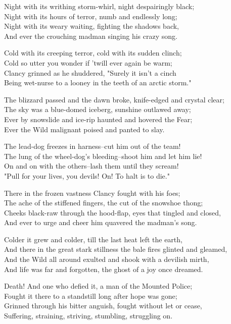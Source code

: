 \begin{poemblock}
 Night with its writhing storm-whirl, night despairingly black;\\
\idt Night with its hours of terror, numb and endlessly long;\\
 Night with its weary waiting, fighting the shadows back,\\
\idt And ever the crouching madman singing his crazy song.

 Cold with its creeping terror, cold with its sudden clinch;\\
\idt Cold so utter you wonder if 'twill ever again be warm;\\
 Clancy grinned as he shuddered, "Surely it isn't a cinch\\
\idt Being wet-nurse to a looney in the teeth of an arctic storm."

 The blizzard passed and the dawn broke, knife-edged and crystal clear;\\
\idt The sky was a blue-domed iceberg, sunshine outlawed away;\\
 Ever by snowslide and ice-rip haunted and hovered the Fear;\\
\idt Ever the Wild malignant poised and panted to slay.

 The lead-dog freezes in harness--cut him out of the team!\\
\idt The lung of the wheel-dog's bleeding--shoot him and let him lie!\\
 On and on with the others--lash them until they scream!\\
\idt "Pull for your lives, you devils! On! To halt is to die."

 There in the frozen vastness Clancy fought with his foes;\\
\idt The ache of the stiffened fingers, the cut of the snowshoe thong;\\
 Cheeks black-raw through the hood-flap, eyes that tingled and closed,\\
\idt And ever to urge and cheer him quavered the madman's song.

 Colder it grew and colder, till the last heat left the earth,\\
\idt And there in the great stark stillness the bale fires glinted and gleamed,\\
 And the Wild all around exulted and shook with a devilish mirth,\\
\idt And life was far and forgotten, the ghost of a joy once dreamed.

Death! And one who defied it, a man of the Mounted Police;\\
\idt Fought it there to a standstill long after hope was gone;\\
 Grinned through his bitter anguish, fought without let or cease,\\
\idt Suffering, straining, striving, stumbling, struggling on.


\end{poemblock}
